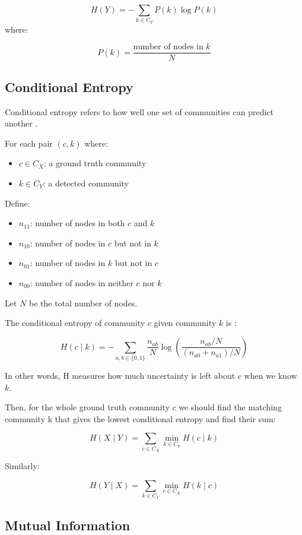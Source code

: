 \documentclass[conference]{IEEEtran}
\begin{document}
\[
H(Y) = -\sum_{k \in C_Y} P(k) \log P(k)
\]
where:

\[
P(k) = \frac{\text{number of nodes in } k}{N}
\]

\subsection*{Conditional Entropy}

Conditional entropy refers to how well one set of communities can predict another \cite{cover2006}.

For each pair \( (c, k) \) where:
\begin{itemize}
    \item \( c \in C_X \): a ground truth community
    \item \( k \in C_Y \): a detected community
\end{itemize}

Define:
\begin{itemize}
    \item \( n_{11} \): number of nodes in both \( c \) and \( k \)
    \item \( n_{10} \): number of nodes in \( c \) but not in \( k \)
    \item \( n_{01} \): number of nodes in \( k \) but not in \( c \)
    \item \( n_{00} \): number of nodes in neither \( c \) nor \( k \)
\end{itemize}

Let \( N \) be the total number of nodes.

The conditional entropy of community \( c \) given community \( k \) is \cite{cover2006}:

\[
H(c \mid k) = -\sum_{a,b \in \{0,1\}} \frac{n_{ab}}{N} \log \left( \frac{n_{ab}/N}{(n_{a0}+n_{a1})/N} \right)
\]

In other words, H measures how much uncertainty is left about \( c \) when we know \( k \).

Then, for the whole ground truth community c we should find the matching community k that gives the lowest conditional entropy and find their sum:

\[
H(X \mid Y) = \sum_{c \in C_X} \min_{k \in C_Y} H(c \mid k)
\]

Similarly:

\[
H(Y \mid X) = \sum_{k \in C_Y} \min_{c \in C_X} H(k \mid c)
\]

\subsection*{Mutual Information}
\end{document}
